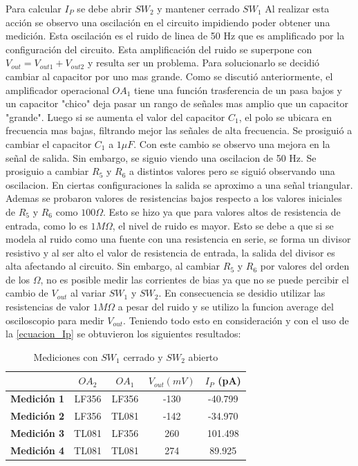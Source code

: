 \documentclass[12pt,a4paper]{article}
\begin{document}
Para calcular $I_{P}$ se debe abrir $SW_2$ y mantener cerrado $SW_1$  Al realizar esta acción se observo una oscilación en el circuito impidiendo poder obtener una medición. Esta oscilación es el ruido de linea de 50 Hz que es amplificado por la configuración del circuito.
Esta amplificación del ruido se superpone con $V_{out} = V_{out1} + V_{out2}$ y resulta ser un problema. Para solucionarlo se decidió cambiar al capacitor por uno mas grande. 
Como se discutió anteriormente, el amplificador operacional $OA_1$ tiene una función trasferencia de un pasa bajos y un capacitor "chico" deja pasar un rango de señales mas amplio que un capacitor "grande". Luego si se aumenta el valor del capacitor $C_1$, el polo se 
ubicara en frecuencia mas bajas, filtrando mejor las señales de alta frecuencia. Se prosiguió a cambiar el capacitor $C_1$ a $1\mu F$. Con este cambio se observo una mejora en la señal de salida. Sin embargo, se siguio viendo una oscilacion de 50 Hz. Se prosiguio a cambiar $R_5$ y $R_6$ a distintos
valores pero se siguió observando una oscilacion. En ciertas configuraciones la salida se aproximo a una señal triangular. Ademas se probaron valores de resistencias bajos respecto a los valores iniciales de $R_5$ y $R_6$ como $100\Omega$. Esto se hizo ya que para valores altos de resistencia de
entrada, como lo es $1M\Omega$, el nivel de ruido es mayor. Esto se debe a que si se modela al ruido como una fuente con una resistencia en serie, se forma un divisor resistivo y al ser alto el valor de resistencia de entrada, la salida del divisor es alta afectando al circuito. Sin embargo, al cambiar 
$R_5$ y $R_6$ por valores del orden de los $\Omega$, no es posible medir las corrientes de bias ya que no se puede percibir el cambio de $V_{out}$ al variar $SW_1$ y $SW_2$. En consecuencia se desidio utilizar las resistencias de valor $1M\Omega$ a pesar del ruido y se utilizo la funcion average del osciloscopio
para medir $V_{out}$.
Teniendo todo esto en consideración y con el uso de la \ref{ecuacion_Ip} se obtuvieron los siguientes resultados:


\begin{table}[h!]
    \centering
    \caption{Mediciones con $SW_1$ cerrado y $SW_2$ abierto}
    \label{table3}
    \begin{tabular}{@{}ccccc@{}}
    \textbf{}           & \textbf{$OA_2$} & \textbf{$OA_1$} & \textbf{$V_{out} (mV)$} & \textbf{$I_P$ (pA)} \\ \midrule
    \textbf{Medición 1} & LF356          & LF356          & -130              & -40.799             \\
    \textbf{Medición 2} & LF356          & TL081          & -142              &  -34.970            \\
    \textbf{Medición 3} & TL081          & LF356          & 260              &  101.498            \\
    \textbf{Medición 4} & TL081          & TL081          & 274              & 89.925             \\ 
    \end{tabular}
\end{table}
\end{document}
